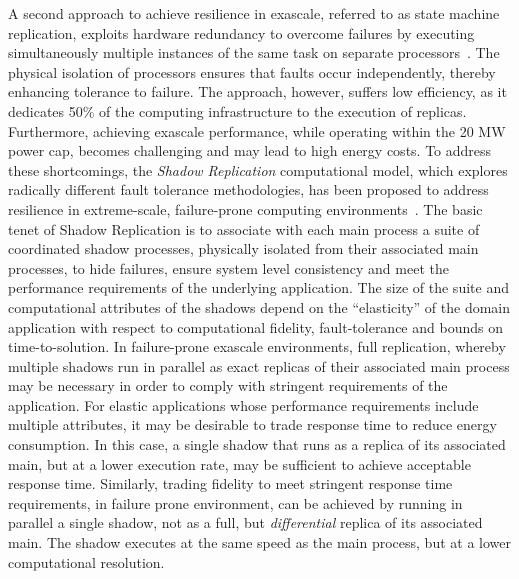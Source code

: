 A second approach to achieve resilience in exascale, referred to as state machine replication, exploits hardware redundancy to overcome failures by executing simultaneously multiple instances of the same task on separate processors~\cite{bartlett_1981_nonstop,tsai_isads_2011,ferreira_sc_2011}. The physical isolation of processors ensures that faults occur independently, thereby enhancing tolerance to failure. The approach, however, suffers low efficiency, as it dedicates 50\% of the computing infrastructure to the execution of replicas. Furthermore, achieving exascale performance, while operating within the 20 MW power cap, becomes challenging and may lead to high energy costs. To address these shortcomings, the {\it Shadow Replication} computational model, which explores radically different fault tolerance methodologies, has been proposed to address resilience in extreme-scale, failure-prone computing environments~\cite{mills2014power}. The basic tenet of Shadow Replication is to associate with each main process a suite of coordinated shadow processes, physically isolated from their associated main processes, to hide failures, ensure system level consistency and meet the performance requirements of the underlying application. The size of the suite and computational attributes of the shadows depend on the “elasticity” of the domain application with respect to computational fidelity, fault-tolerance and bounds on time-to-solution. In failure-prone exascale environments, full replication, whereby multiple shadows run in parallel as exact replicas of their associated main process may be necessary in order to comply with stringent requirements of the application.  For elastic applications whose performance requirements include multiple attributes, it may be desirable to trade response time to reduce energy consumption. In this case, a single shadow that runs as a replica of its associated main, but at a lower execution rate, may be sufficient to achieve acceptable response time. Similarly, trading fidelity to meet stringent response time requirements, in failure prone environment, can be achieved by running in parallel a single shadow, not as a full, but {\it differential} replica of its associated main. The shadow executes at the same speed as the main process, but at a lower computational resolution. 

